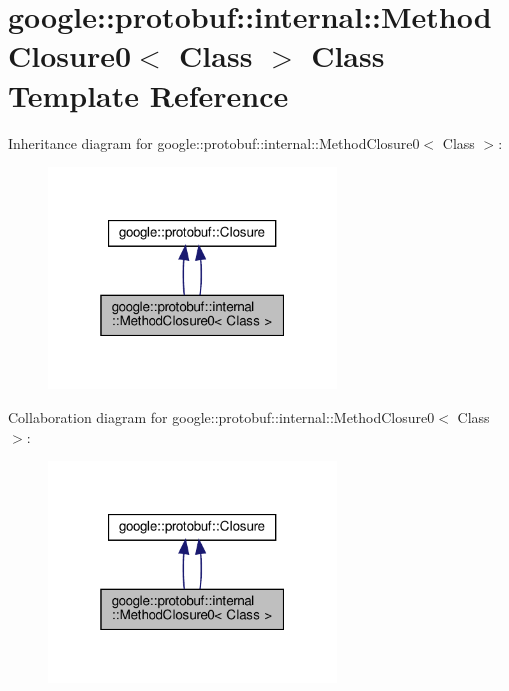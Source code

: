 \hypertarget{classgoogle_1_1protobuf_1_1internal_1_1MethodClosure0}{}\section{google\+:\+:protobuf\+:\+:internal\+:\+:Method\+Closure0$<$ Class $>$ Class Template Reference}
\label{classgoogle_1_1protobuf_1_1internal_1_1MethodClosure0}


Inheritance diagram for google\+:\+:protobuf\+:\+:internal\+:\+:Method\+Closure0$<$ Class $>$\+:
\nopagebreak
\begin{figure}[H]
\begin{center}
\leavevmode
\includegraphics[width=217pt]{classgoogle_1_1protobuf_1_1internal_1_1MethodClosure0__inherit__graph}
\end{center}
\end{figure}


Collaboration diagram for google\+:\+:protobuf\+:\+:internal\+:\+:Method\+Closure0$<$ Class $>$\+:
\nopagebreak
\begin{figure}[H]
\begin{center}
\leavevmode
\includegraphics[width=217pt]{classgoogle_1_1protobuf_1_1internal_1_1MethodClosure0__coll__graph}
\end{center}
\end{figure}
